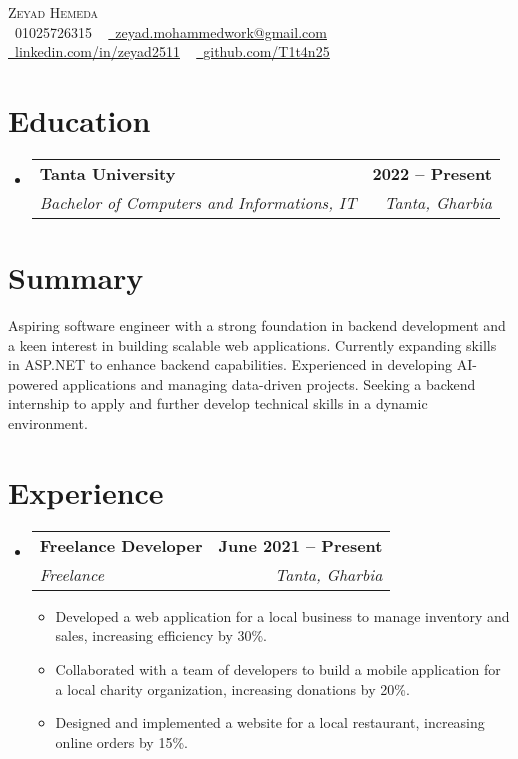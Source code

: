 \documentclass[letterpaper,11pt]{article}
\makeatletter
\newcommand{\resumeItem}[1]{
  \item\small{
    {#1 \vspace{-2pt}}
  }
}
\newcommand{\resumeSubheading}[4]{
  \vspace{-2pt}\item
    \begin{tabular*}{1.0\textwidth}[t]{l@{\extracolsep{\fill}}r}
      \textbf{#1} & \textbf{\small #2} \\
      \textit{\small#3} & \textit{\small #4} \\
    \end{tabular*}\vspace{-7pt}
}
\newcommand{\resumeEduSubheading}[4]{
  \vspace{-2pt}\item
    \begin{tabular*}{1.0\textwidth}[t]{l@{\extracolsep{\fill}}r}
      \textbf{#1} & \textbf{\small #2} \\
      \textit{\small#3} & \textit{\small #4} \\
    \end{tabular*}\vspace{-7pt}
}
\newcommand{\resumeSubHeadingListStart}{\begin{itemize}[leftmargin=0.0in, label={}]}
\newcommand{\resumeSubHeadingListEnd}{\end{itemize}}
\newcommand{\resumeItemListStart}{\begin{itemize}}
\newcommand{\resumeItemListEnd}{\end{itemize}\vspace{-5pt}}
\newcommand{\summaryPlaceholder}[1]{#1}
\newcommand{\eduPlaceholder}[1]{#1}
\newcommand{\expPlaceholder}[1]{#1}
\newcommand{\infoPlaceholder}[1]{#1}
\makeatother
\begin{document}
\begin{center}
  \infoPlaceholder{
    {\Huge \scshape Zeyad Hemeda} \\ \vspace{1pt}
    \small \raisebox{-0.1\height}\faPhone\ 01025726315 ~ \href{mailto:zeyad.mohammedwork@gmail.com}{\raisebox{-0.2\height}\faEnvelope\  \underline{zeyad.mohammedwork@gmail.com}} ~ 
    \href{https://linkedin.com/in/zeyad2511}{\raisebox{-0.2\height}\faLinkedin\ \underline{linkedin.com/in/zeyad2511}}  ~
    \href{https://github.com/T1t4n25}{\raisebox{-0.2\height}\faGithub\ \underline{github.com/T1t4n25}}
  }
    \vspace{-8pt}
\end{center}

\section{Education}
  \resumeSubHeadingListStart
  \eduPlaceholder{
    \resumeEduSubheading
    {Tanta University}{2022 -- Present}
    {Bachelor of Computers and Informations, IT}{Tanta, Gharbia}
  }
  \resumeSubHeadingListEnd


\section{Summary}
\small{
  \summaryPlaceholder{
Aspiring software engineer with a strong foundation in backend development and a keen interest in building scalable web applications. Currently expanding skills in ASP.NET to enhance backend capabilities. Experienced in developing AI-powered applications and managing data-driven projects. Seeking a backend internship to apply and further develop technical skills in a dynamic environment.
  }
}
\vspace{-10pt}

\section{Experience}

  \resumeSubHeadingListStart
    \expPlaceholder{
    \resumeSubheading
      {Freelance Developer}{June 2021 -- Present}
      {Freelance}{Tanta, Gharbia}
      \resumeItemListStart
        \resumeItem{Developed a web application for a local business to manage inventory and sales, increasing efficiency by 30\%.}
        \resumeItem{Collaborated with a team of developers to build a mobile application for a local charity organization, increasing donations by 20\%.}
        \resumeItem{Designed and implemented a website for a local restaurant, increasing online orders by 15\%.}
      \resumeItemListEnd
}
  \resumeSubHeadingListEnd
  \vspace{-16pt}
\end{document}
